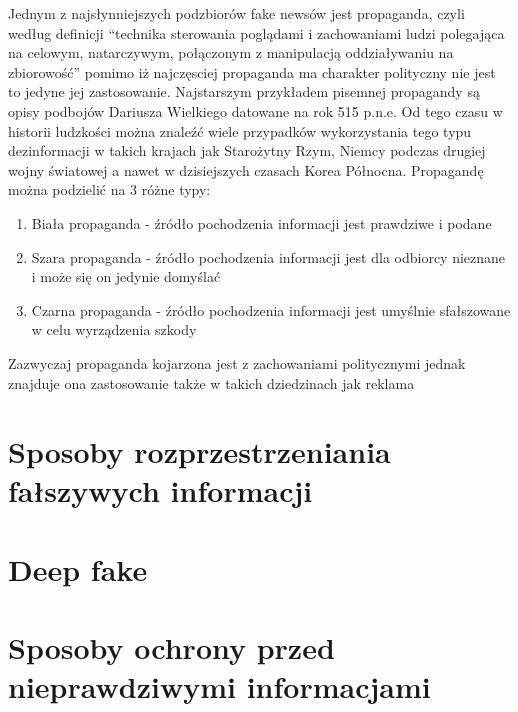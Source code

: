 Jednym z najsłynniejszych podzbiorów fake newsów jest propaganda, czyli według 
definicji ``technika sterowania poglądami i zachowaniami ludzi polegająca na 
celowym, natarczywym, połączonym z manipulacją oddziaływaniu na zbiorowość''
pomimo iż najczęsciej propaganda ma charakter polityczny nie jest to jedyne 
jej zastosowanie. Najstarszym przykładem pisemnej propagandy są opisy podbojów
Dariusza Wielkiego datowane na rok 515 p.n.e. Od tego czasu w historii ludzkości
można znaleźć wiele przypadków wykorzystania tego typu dezinformacji w takich krajach
jak Starożytny Rzym, Niemcy podczas drugiej wojny światowej a nawet w dzisiejszych 
czasach Korea Północna.
Propagandę można podzielić na 3 różne typy:
\begin{enumerate}
    \item Biała propaganda - źródło pochodzenia informacji jest prawdziwe i podane
    \item Szara propaganda - źródło pochodzenia informacji jest dla odbiorcy nieznane i może się on jedynie domyślać
    \item Czarna propaganda - źródło pochodzenia informacji jest umyślnie sfałszowane w celu wyrządzenia szkody 
\end{enumerate}

Zazwyczaj propaganda kojarzona jest z zachowaniami politycznymi jednak znajduje ona 
zastosowanie także w takich dziedzinach jak reklama

\section{Sposoby rozprzestrzeniania fałszywych informacji}

\section{Deep fake}

\section{Sposoby ochrony przed nieprawdziwymi informacjami}
